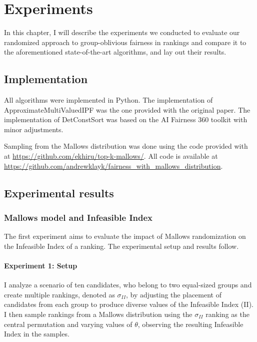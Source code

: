 
\chapter{Experiments}\label{chapt:experiments}

In this chapter, I will describe the experiments we conducted to evaluate our randomized approach to group-oblivious fairness in rankings and compare it to the aforementioned state-of-the-art algorithms, and lay out their results.

\section{Implementation}

All algorithms were implemented in Python. The implementation of ApproximateMultiValuedIPF was the one provided with the original paper. The implementation of DetConstSort was based on the AI Fairness 360 toolkit with minor adjustments.

Sampling from the Mallows distribution was done using the code provided with \cite{fabien2020concentric} at \url{https://github.com/ekhiru/top-k-mallows/}.
All code is available at \url{https://github.com/andrewklayk/fairness_with_mallows_distribution}.

\section{Experimental results}

\subsection{Mallows model and Infeasible Index}\label{exp:exp1}
\label{sec:mallows-ii-exp}
The first experiment aims to evaluate the impact of Mallows randomization on the Infeasible Index of a ranking. The experimental setup and results follow.

\subsubsection{Experiment 1: Setup}
I analyze a scenario of ten candidates, who belong to two equal-sized groups and create multiple rankings, denoted as $\sigma_{II}$, by adjusting the placement of candidates from each group to produce diverse values of the Infeasible Index (II). I then sample rankings from a Mallows distribution using the $\sigma_{II}$ ranking as the central permutation and varying values of $\theta$, observing the resulting Infeasible Index in the samples. 

